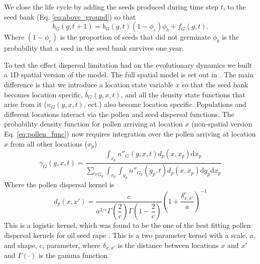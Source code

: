 \documentclass[10pt,letterpaper]{article}
\begin{document}
We close the life cycle by adding the seeds produced during time step $t$, to the seed bank (Eq. \ref{eq:above_ground}) so that 
\begin{equation}
	b_G(g, t + 1) = b_G(g, t)(1 - \phi_e)\phi_b + f_G(g, t).  
\end{equation}
Where $(1 - \phi_e)$ is the proportion of seeds that did not germinate $\phi_b$ is the probability that a seed in the seed bank survives one year. 

To test the effect dispersal limitation had on the evolutionary dynamics we built a 1D spatial version of the model. The full spatial model is set out in . The main difference is that we introduce a location state variable $x$ so that the seed bank becomes location specific, $b_G(g, x, t)$, and all the density state functions that arise from it ($n_G(g, x, t)$, ect.) also become location specific. Populations and different locations interact via the pollen and seed dispersal functions. The probability density function for pollen arriving at location $x$ (non-spatial version Eq. \ref{eq:pollen_func}) now requires integration over the pollen arriving at location $x$ from all other locations ($x_p$)  
\begin{equation}\label{eq:pollen_func_space}
\gamma_G(g, x, t) = \frac{\int_{x_p} n''_G(g, x, t)d_p(x, x_p)\text{d}x_p} {\sum_{\forall G_p}\int_{x_p}\int_{g_p} n''_{G_p}(g_p, t)d_p(x, x_p) \text{d}g_p\text{d}x_p} 
\end{equation}     
Where the pollen dispersal kernel is 
\begin{equation}\label{eq:pollen_disp}
	d_p(x, x') = \frac{c}{a^{2/c}\Gamma\left(\dfrac{2}{c} \right)\Gamma\left(1 - \dfrac{2}{c} \right)}\left( 1 + \dfrac{\delta_{x,x'}^c}{a} \right)^{-1} 
\end{equation} 
This is a logistic kernel, which was found to be the one of the best fitting pollen dispersal kernels for oil seed rape \cite{Klei2006}. This is a two parameter kernel with a scale, $a$, and shape, $c$, parameter, where $\delta_{x,x'}$ is the distance between locations $x$ and $x'$ and $\Gamma(\cdot)$ is the gamma function. 
\end{document}
